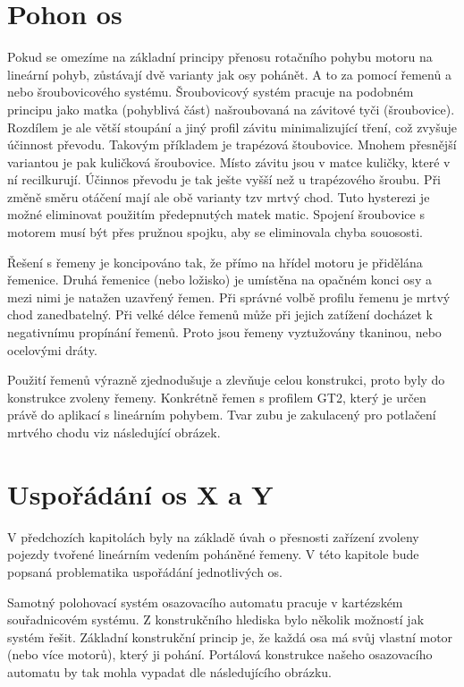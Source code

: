 \section{Pohon os}
Pokud se omezíme na základní principy přenosu rotačního pohybu motoru na lineární pohyb, zůstávají dvě varianty jak osy pohánět. A to za pomocí řemenů a nebo šroubovicového systému.
Šroubovicový systém pracuje na podobném principu jako matka (pohyblivá část) našroubovaná na závitové tyči (šroubovice). Rozdílem je ale větší stoupání a jiný profil závitu minimalizující tření, což zvyšuje účinnost převodu. Takovým příkladem je trapézová štoubovice. Mnohem přesnější variantou je pak kuličková šroubovice. Místo závitu jsou v matce kuličky, které v ní recilkurují. Účinnos převodu je tak ješte vyšší než u trapézového šroubu. Při změně směru otáčení mají ale obě varianty tzv mrtvý chod. Tuto hysterezi je možné eliminovat použitím předepnutých matek matic.
Spojení šroubovice s motorem musí být přes pružnou spojku, aby se eliminovala chyba souososti.

Řešení s řemeny je koncipováno tak, že přímo na hřídel motoru je přidělána řemenice. Druhá řemenice (nebo ložisko) je umístěna na opačném konci osy a mezi nimi je natažen uzavřený řemen.
Při správné volbě profilu řemenu je mrtvý chod zanedbatelný. Při velké délce řemenů může při jejich zatížení docházet k negativnímu propínání řemenů. Proto jsou řemeny vyztužovány tkaninou, nebo ocelovými dráty.

Použití řemenů výrazně zjednodušuje a zlevňuje celou konstrukci, proto byly do konstrukce zvoleny řemeny. Konkrétně řemen s profilem GT2, který je určen právě do aplikací s lineárním pohybem. Tvar zubu je zakulacený pro potlačení mrtvého chodu viz následující obrázek.


\section{Uspořádání os X a Y}

V předchozích kapitolách byly na základě úvah o přesnosti zařízení zvoleny pojezdy tvořené lineárním vedením poháněné řemeny. V této kapitole bude popsaná problematika uspořádání jednotlivých os.

Samotný polohovací systém osazovacího automatu pracuje v kartézském souřadnicovém systému.  Z konstrukčního hlediska bylo několik možností jak systém řešit. Základní konstrukční princip je, že každá osa má svůj vlastní motor (nebo více motorů), který ji pohání. Portálová konstrukce našeho osazovacího automatu by tak mohla vypadat dle následujícího obrázku.

